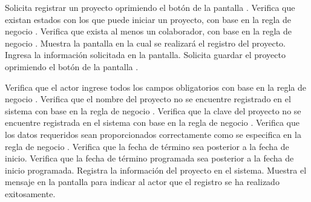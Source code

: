  \begin{UCtrayectoria}
    \UCpaso[\UCactor] Solicita registrar un proyecto oprimiendo el botón  de la pantalla .
    \UCpaso[\UCsist] Verifica que existan estados con los que puede iniciar un proyecto, con base en la regla de negocio . 
    \UCpaso[\UCsist] Verifica que exista al menos un colaborador, con base en la regla de negocio . 
    \UCpaso[\UCsist] Muestra la pantalla  en la cual se realizará el registro del proyecto. 
    \UCpaso[\UCactor] Ingresa la información solicitada en la pantalla. \label{cu1.1:ingresaDatos}
    \UCpaso[\UCactor] Solicita guardar el proyecto oprimiendo el botón  de la pantalla .  
    
    \UCpaso[\UCsist] Verifica que el actor ingrese todos los campos obligatorios con base en la regla de negocio  . 
    \UCpaso[\UCsist] Verifica que el nombre del proyecto no se encuentre registrado en el sistema con base en la regla de negocio  . 
    \UCpaso[\UCsist] Verifica que la clave del proyecto no se encuentre registrada en el sistema con base en la regla de negocio  . 
    \UCpaso[\UCsist] Verifica que los datos requeridos sean proporcionados correctamente como se especifica en la regla de negocio .  
    \UCpaso[\UCsist] Verifica que la fecha de término sea posterior a la fecha de inicio. 
    \UCpaso[\UCsist] Verifica que la fecha de término programada sea posterior a la fecha de inicio programada. 
    \UCpaso[\UCsist] Registra la información del proyecto en el sistema.
    \UCpaso[\UCsist] Muestra el mensaje  en la pantalla 
    para indicar al actor que el registro se ha realizado exitosamente.
 \end{UCtrayectoria}

